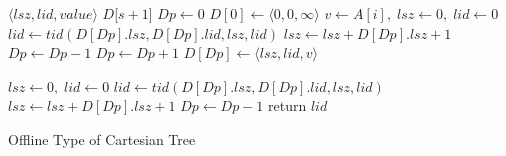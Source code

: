 \begin{algorithm}
\SetAlgoNoLine
{}
$\langle\mathit{lsz},\mathit{lid},\mathit{value}\rangle$ $D$[$s+1$] \;
$\textit{Dp} \gets 0$ \;
$D[0] \gets \langle 0,0,\infty \rangle$ \;
 {
  $v \gets A[i], \; \textit{lsz} \gets 0, \; \textit{lid} \gets 0$ \;
   {
    $\textit{lid} \gets \textit{tid}(D[\textit{Dp}].\textit{lsz}, D[\textit{Dp}].\textit{lid}, \textit{lsz}, \textit{lid})$ \;
    $\textit{lsz} \gets \textit{lsz} + D[\textit{Dp}].\textit{lsz} + 1$ \;
    $\textit{Dp} \gets \textit{Dp} - 1$ \;
  }
  $\textit{Dp} \gets \textit{Dp} + 1$ \;
  $D[\textit{Dp}] \gets \langle\mathit{lsz},\mathit{lid},\mathit{v}\rangle$ \;
}

$\textit{lsz} \gets 0, \; \textit{lid} \gets 0$ \;
 {
  $\textit{lid} \gets \textit{tid}(D[\textit{Dp}].\textit{lsz}, D[\textit{Dp}].\textit{lid}, \textit{lsz}, \textit{lid})$ \;
  $\textit{lsz} \gets \textit{lsz} + D[\textit{Dp}].\textit{lsz} + 1$ \;
  $\textit{Dp} \gets \textit{Dp} - 1$ \;
}
return $\textit{lid}$ \;

\caption{Offline Type of Cartesian Tree}
\label{alg:cartesian-encode-offline}
\end{algorithm}